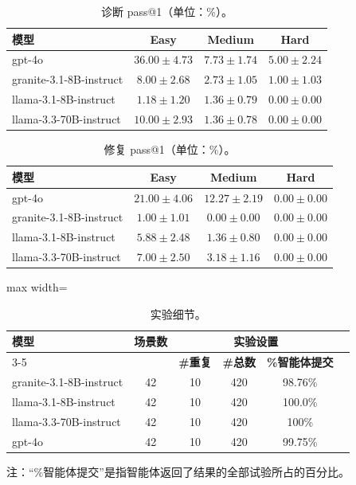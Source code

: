 \begin{table}[H]
\centering
\caption{诊断 pass@1（单位：\%）。}
\label{tab:itb-tab17}
\begin{tabular}{lccc}
\toprule
\textbf{模型} & \textbf{Easy} & \textbf{Medium} & \textbf{Hard} \\
\midrule
gpt-4o & $36.00 \pm 4.73$ & $7.73 \pm 1.74$ & $5.00 \pm 2.24$ \\
granite-3.1-8B-instruct & $8.00 \pm 2.68$ & $2.73 \pm 1.05$ & $1.00 \pm 1.03$ \\
llama-3.1-8B-instruct & $1.18 \pm 1.20$ & $1.36 \pm 0.79$ & $0.00 \pm 0.00$ \\
llama-3.3-70B-instruct & $10.00 \pm 2.93$ & $1.36 \pm 0.78$ & $0.00 \pm 0.00$ \\
\bottomrule
\end{tabular}
\end{table}

\begin{table}[H]
\centering
\caption{修复 pass@1（单位：\%）。}
\label{tab:itb-tab18}
\begin{tabular}{lccc}
\toprule
\textbf{模型} & \textbf{Easy} & \textbf{Medium} & \textbf{Hard} \\
\midrule
gpt-4o & $21.00 \pm 4.06$ & $12.27 \pm 2.19$ & $0.00 \pm 0.00$ \\
granite-3.1-8B-instruct & $1.00 \pm 1.01$ & $0.00 \pm 0.00$ & $0.00 \pm 0.00$ \\
llama-3.1-8B-instruct & $5.88 \pm 2.48$ & $1.36 \pm 0.80$ & $0.00 \pm 0.00$ \\
llama-3.3-70B-instruct & $7.00 \pm 2.50$ & $3.18 \pm 1.16$ & $0.00 \pm 0.00$ \\
\bottomrule
\end{tabular}
\end{table}

\begin{table}[H]
\centering
\caption{实验细节。}
\label{tab:itb-tab16}
\begin{adjustbox}{max width=\linewidth}
\begin{tabular}{lccccc}
\toprule
\multirow{2}{*}{\textbf{模型}} & \multirow{2}{*}{\textbf{场景数}} & \multicolumn{3}{c}{\textbf{实验设置}} \\
\cmidrule(lr){3-5}
 & & \textbf{\#重复} & \textbf{\#总数} & \textbf{\%智能体提交} \\
\midrule
granite-3.1-8B-instruct & 42 & 10 & 420 & 98.76\% \\
llama-3.1-8B-instruct & 42 & 10 & 420 & 100.0\% \\
llama-3.3-70B-instruct & 42 & 10 & 420 & 100\% \\
gpt-4o & 42 & 10 & 420 & 99.75\% \\
\bottomrule
\end{tabular}
\end{adjustbox}

\footnotesize 注：“\%智能体提交”是指智能体返回了结果的全部试验所占的百分比。
\end{table}

